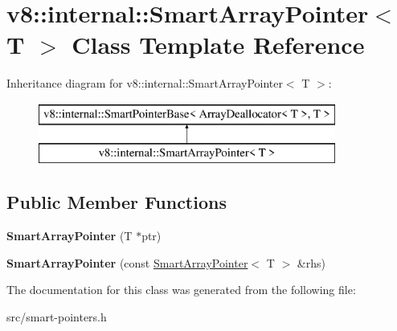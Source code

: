 \hypertarget{classv8_1_1internal_1_1_smart_array_pointer}{}\section{v8\+:\+:internal\+:\+:Smart\+Array\+Pointer$<$ T $>$ Class Template Reference}
\label{classv8_1_1internal_1_1_smart_array_pointer}
Inheritance diagram for v8\+:\+:internal\+:\+:Smart\+Array\+Pointer$<$ T $>$\+:\begin{figure}[H]
\begin{center}
\leavevmode
\includegraphics[height=2.000000cm]{classv8_1_1internal_1_1_smart_array_pointer}
\end{center}
\end{figure}
\subsection*{Public Member Functions}
\begin{DoxyCompactItemize}
\item 
\hypertarget{classv8_1_1internal_1_1_smart_array_pointer_a6c5bce608b2bd498a8b6ae43f705623f}{}{\bfseries Smart\+Array\+Pointer} (T $\ast$ptr)\label{classv8_1_1internal_1_1_smart_array_pointer_a6c5bce608b2bd498a8b6ae43f705623f}

\item 
\hypertarget{classv8_1_1internal_1_1_smart_array_pointer_a735c47933f4f13e2f8d023decea106c3}{}{\bfseries Smart\+Array\+Pointer} (const \hyperlink{classv8_1_1internal_1_1_smart_array_pointer}{Smart\+Array\+Pointer}$<$ T $>$ \&rhs)\label{classv8_1_1internal_1_1_smart_array_pointer_a735c47933f4f13e2f8d023decea106c3}

\end{DoxyCompactItemize}


The documentation for this class was generated from the following file\+:\begin{DoxyCompactItemize}
\item 
src/smart-\/pointers.\+h\end{DoxyCompactItemize}
